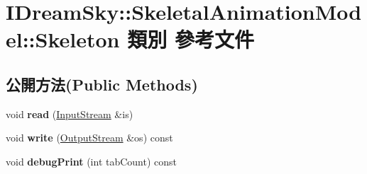 \hypertarget{class_i_dream_sky_1_1_skeletal_animation_model_1_1_skeleton}{}\section{I\+Dream\+Sky\+:\+:Skeletal\+Animation\+Model\+:\+:Skeleton 類別 參考文件}
\label{class_i_dream_sky_1_1_skeletal_animation_model_1_1_skeleton}
\subsection*{公開方法(Public Methods)}
\begin{DoxyCompactItemize}
\item 
void {\bfseries read} (\hyperlink{class_i_dream_sky_1_1_input_stream}{Input\+Stream} \&is)\hypertarget{class_i_dream_sky_1_1_skeletal_animation_model_1_1_skeleton_aaffc94b93db429134ce7986a218a2acc}{}\label{class_i_dream_sky_1_1_skeletal_animation_model_1_1_skeleton_aaffc94b93db429134ce7986a218a2acc}

\item 
void {\bfseries write} (\hyperlink{class_i_dream_sky_1_1_output_stream}{Output\+Stream} \&os) const \hypertarget{class_i_dream_sky_1_1_skeletal_animation_model_1_1_skeleton_a4a30dedc6a33a068447d483930fc4e17}{}\label{class_i_dream_sky_1_1_skeletal_animation_model_1_1_skeleton_a4a30dedc6a33a068447d483930fc4e17}

\item 
void {\bfseries debug\+Print} (int tab\+Count) const \hypertarget{class_i_dream_sky_1_1_skeletal_animation_model_1_1_skeleton_aebc80f6f04ebd6c6b6a49985f777d0ce}{}\label{class_i_dream_sky_1_1_skeletal_animation_model_1_1_skeleton_aebc80f6f04ebd6c6b6a49985f777d0ce}

\end{DoxyCompactItemize}
